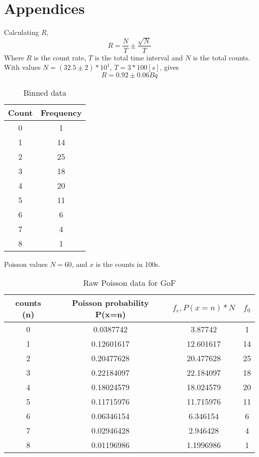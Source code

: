 \documentclass[11pt]{article}
\begin{document}
    \section{Appendices}
    Calculating $R$, $$ R = \frac{N}{T} \pm \frac{\sqrt{N}}{T}$$
  Where $R$ is the count rate, $T$ is the total time interval and $N$ is the total counts. With values $N =( 32.5 \pm 2) * 10^{1}$, $T= 3 * 100 [s]$, gives 
  $$R = 0.92 \pm 0.06  Bq$$ 
    \begin{table}[h]
        \centering
        \begin{tabular}{|c|c|}
        \hline
          \textbf{Count}  & \textbf{Frequency} \\
          \hline
           0  & 1 \\
           1 & 14\\
           2  & 25 \\
           3  & 18 \\
           4  & 20 \\
           5  & 11 \\
           6  & 6\\
           7  & 4 \\
           8  & 1 \\
           \hline
        \end{tabular}
        \caption{Binned data}
        \label{tab:my_label}
    \end{table}
    Poisson values 
    $N = 60$, and $x$ is the counts in 100s. 
    \begin{table}[h]
        \centering
        \begin{tabular}{|c|c|c|c|}
         \hline
           counts (n)  & Poisson probability P(x=n) & $ f_{e}, P(x=n) * N$ & $f_{0}$ \\
            \hline
            0 & 0.0387742 & 3.87742 & 1 \\
            1 & 0.12601617 & 12.601617 & 14\\
            2 & 0.20477628 & 20.477628 & 25\\
            3 & 0.22184097 & 22.184097 & 18\\
            4 & 0.18024579 & 18.024579 & 20\\
            5 & 0.11715976 & 11.715976 & 11\\
            6 & 0.06346154 & 6.346154 & 6 \\
            7 & 0.02946428 & 2.946428 & 4\\
            8 & 0.01196986 & 1.1996986 & 1\\
             \hline
        \end{tabular}
        \caption{Raw Poisson data for GoF}
        \label{tab:my_label}
    \end{table}
\end{document}
